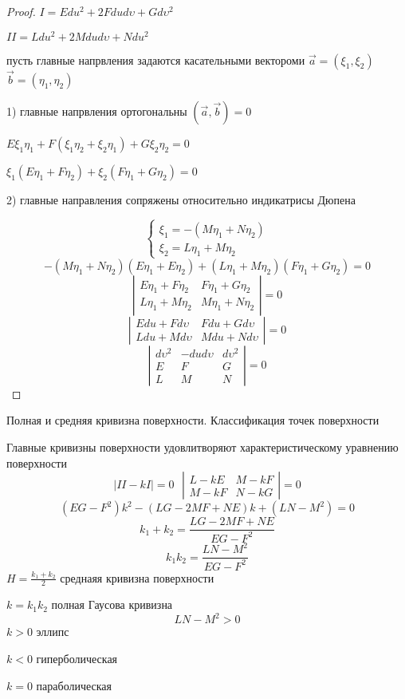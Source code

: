 \begin{proof}
  $I = Edu^2 + 2Fdud\upsilon + Gd\upsilon^2$

  $II = Ldu^2 + 2Mdud\upsilon + Ndu^2$

  пусть главные напрвления задаются касательными вектороми
  $\vec a = (\xi_1,\xi_2)$ $\vec b = (\eta_1, \eta_2)$

  1) главные напрвления ортогональны $(\vec a, \vec b) = 0$

  $E\xi_1 \eta_1 + F(\xi_1 \eta_2 + \xi_2 \eta_1) + G\xi_2 \eta_2 = 0$

  $\xi_1(E\eta_1 + F\eta_2) + \xi_2(F\eta_1 + G\eta_2) = 0$

  2) главные направления сопряжены относительно индикатрисы Дюпена

  $$
  \left\{
  \begin{array}{l}
    \xi_1 = -(M\eta_1 + N \eta_2) \\
    \xi_2 = L\eta_1 + M \eta_2
  \end{array}
  \right.
  $$
  $$
  -(M\eta_1 + N\eta_2)(E\eta_1 + E\eta_2) + (L\eta_1 + M\eta_2)(F\eta_1 +
  G\eta_2) = 0
  $$
  $$
  \left|
  \begin{array}{cc}
    E\eta_1 + F\eta_2 & F\eta_1 + G\eta_2 \\
    L\eta_1 + M\eta_2 & M\eta_1 + N\eta_2
  \end{array}
  \right| = 0
  $$
  $$
  \left|
  \begin{array}{cc}
    Edu + Fd\upsilon & Fdu + Gd\upsilon \\
    Ldu + Md\upsilon & Mdu + Nd\upsilon
  \end{array}
  \right| = 0
  $$
  $$
  \left|
  \begin{array}{ccc}
    d\upsilon^2 & -dud\upsilon & d\upsilon^2 \\
    E & F & G \\
    L & M & N
  \end{array}
  \right| = 0
  $$
\end{proof}

\begin{title}[\Large]
  Полная и средняя кривизна поверхности. Классификация точек поверхности
\end{title}

\begin{theorem}
  Главные кривизны поверхности удовлитворяют характеристическому уравнению
  поверхности
  $$
  |II - kI| = 0 ~~~
  \left|
  \begin{array}{cc}
    L - kE & M - kF \\
    M - kF & N - kG
  \end{array}
  \right| = 0
  $$
  $$
  (EG - F^2)k^2 - (LG - 2MF + NE)k + (LN - M^2) = 0
  $$
  $$
  k_1 + k_2 = \frac{LG - 2MF + NE}{EG - F^2}
  $$
  $$
  k_1 k_2 = \frac{LN - M^2}{EG - F^2}
  $$
  $H = \frac{k_1 + k_2}{2}$ среднаяя кривизна поверхности

  $k = k_1 k_2$ полная Гаусова кривизна
  $$
  LN - M^2 > 0
  $$
  $k > 0$ эллипс

  $k < 0$ гиперболическая

  $k = 0$ параболическая
\end{theorem}
